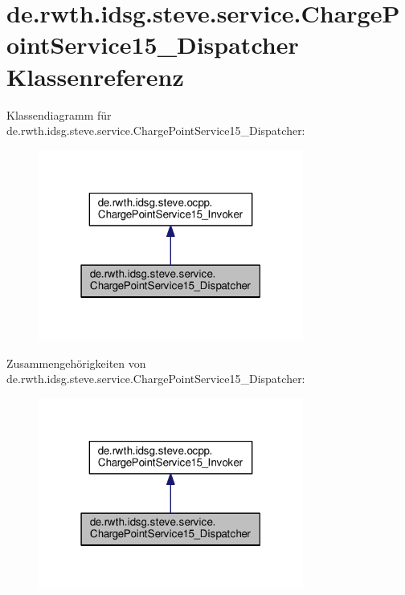 \hypertarget{classde_1_1rwth_1_1idsg_1_1steve_1_1service_1_1_charge_point_service15___dispatcher}{\section{de.\+rwth.\+idsg.\+steve.\+service.\+Charge\+Point\+Service15\+\_\+\+Dispatcher Klassenreferenz}
\label{classde_1_1rwth_1_1idsg_1_1steve_1_1service_1_1_charge_point_service15___dispatcher}
}


Klassendiagramm für de.\+rwth.\+idsg.\+steve.\+service.\+Charge\+Point\+Service15\+\_\+\+Dispatcher\+:\nopagebreak
\begin{figure}[H]
\begin{center}
\leavevmode
\includegraphics[width=247pt]{classde_1_1rwth_1_1idsg_1_1steve_1_1service_1_1_charge_point_service15___dispatcher__inherit__graph}
\end{center}
\end{figure}


Zusammengehörigkeiten von de.\+rwth.\+idsg.\+steve.\+service.\+Charge\+Point\+Service15\+\_\+\+Dispatcher\+:\nopagebreak
\begin{figure}[H]
\begin{center}
\leavevmode
\includegraphics[width=247pt]{classde_1_1rwth_1_1idsg_1_1steve_1_1service_1_1_charge_point_service15___dispatcher__coll__graph}
\end{center}
\end{figure}

